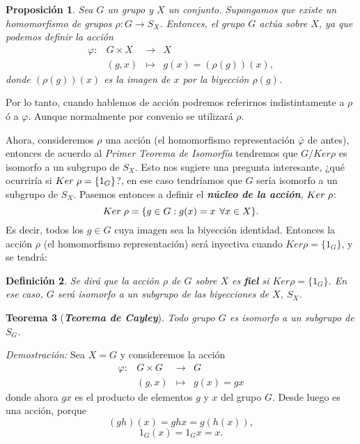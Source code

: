 \documentclass[12pt]{article}
\newtheorem{theorem}{Teorema}[section]
\newtheorem{proposition}[theorem]{Proposición}
\newtheorem{definition}[theorem]{Definición}
\begin{document}
\begin{proposition} \label{eq:homrep} Sea $G$ un grupo y $X$ un conjunto. Supongamos que existe un homomorfismo de grupos $\rho \colon G \longrightarrow S_X$. Entonces, el grupo $G$ actúa sobre $X$, ya que podemos definir la acción $$\begin{array}{rccl}
\varphi\colon &G \times X& \longrightarrow &X\\
&(g,x)& \longmapsto &g(x) = (\rho(g))(x),
\end{array}
$$ donde $(\rho(g))(x)$ es la imagen de $x$ por la biyección $\rho(g)$.
\end{proposition}

Por lo tanto, cuando hablemos de acción podremos referirnos indistintamente a $\rho$ ó a $\varphi$. Aunque normalmente por convenio se utilizará $\rho$.

Ahora, consideremos $\rho$ una acción (el homomorfismo representación $\bar{\varphi}$ de antes), entonces de acuerdo al \textit{Primer Teorema de Isomorfía} tendremos que $G/Ker\rho$ es isomorfo a un subgrupo de $S_X$. Esto nos sugiere una pregunta interesante, ¿qué ocurriría si $Ker\hspace{0.1cm} \rho = \lbrace 1_{G} \rbrace$?, en ese caso tendríamos que $G$ sería isomorfo a un subgrupo de $S_X$. Pasemos entonces a definir el \textbf{\textit{núcleo de la acción}}, $Ker\hspace{0.1cm} \rho$:
$$Ker\hspace{0.1cm} \rho = \lbrace g \in G : g(x) = x \hspace{0.15cm} \forall x \in X \rbrace.$$ Es decir, todos los $g \in G$ cuya imagen sea la biyección identidad. Entonces la acción $\rho$ (el homomorfismo representación) será inyectiva cuando $Ker\rho = \lbrace 1_{G} \rbrace$, y se tendrá:

\begin{definition} Se dirá que la acción $\rho$ de $G$ sobre $X$ es \textbf{fiel} si $Ker \rho = \lbrace 1_{G} \rbrace$. En ese caso, $G$ será isomorfo a un subgrupo de las biyecciones de $X$, $S_X$.
\end{definition}

\begin{theorem}[\textit{\textbf{Teorema de Cayley}}]
Todo grupo $G$ es isomorfo a un subgrupo de $S_G$.
\end{theorem}
\emph{Demostración: } Sea $X = G$ y consideremos la acción $$\begin{array}{rccl}
\varphi \colon &G \times G& \longrightarrow &G\\
&(g,x)& \longmapsto &g(x) = gx
\end{array}
$$ donde ahora $gx$ es el producto de elementos $g$ y $x$ del grupo $G$. Desde luego es una acción, porque $$(gh)(x) = ghx = g(h(x)),$$ $$1_{G}(x) = 1_{G}x = x.$$
\end{document}
